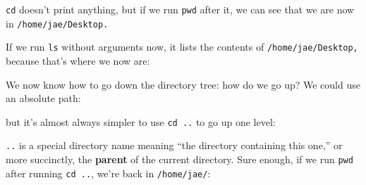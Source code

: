 \documentclass[
  letterpaper,
  DIV=11,
  numbers=noendperiod]{scrreprt}
\newenvironment{Shaded}{\begin{snugshade}}{\end{snugshade}}
\newcommand{\ExtensionTok}[1]{\textcolor[rgb]{0.00,0.23,0.31}{#1}}
\newcommand{\NormalTok}[1]{\textcolor[rgb]{0.00,0.23,0.31}{#1}}
\begin{document}
\begin{Shaded}
\end{Shaded}

\texttt{cd} doesn't print anything, but if we run \texttt{pwd} after it,
we can see that we are now in \texttt{/home/jae/Desktop.}

If we run \texttt{ls} without arguments now, it lists the contents of
\texttt{/home/jae/Desktop,} because that's where we now are:

\begin{Shaded}
\end{Shaded}

We now know how to go down the directory tree: how do we go up? We could
use an absolute path:

\begin{Shaded}
\end{Shaded}

but it's almost always simpler to use \texttt{cd\ ..} to go up one
level:

\begin{Shaded}
\end{Shaded}

\texttt{..} is a special directory name meaning ``the directory
containing this one,'' or more succinctly, the \textbf{parent} of the
current directory. Sure enough, if we run \texttt{pwd} after running
\texttt{cd\ ..}, we're back in \texttt{/home/jae/}:

\begin{Shaded}
\end{Shaded}
\end{document}
